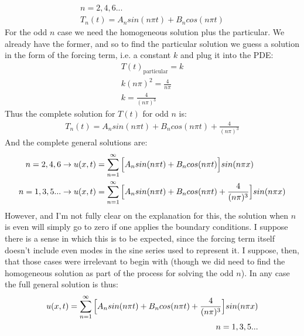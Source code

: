 \documentclass{article}
\begin{document}
\begin{equation}
\begin{aligned}
n = 2,4,6...\\
T_n(t) = A_n sin(n\pi t) + B_n cos(n\pi t)
\end{aligned}
\end{equation}
For the odd $n$ case we need the homogeneous solution plus the particular. We already have the former, and so to find the particular solution we guess a solution in the form of the forcing term, i.e. a constant $k$ and plug it into the PDE:
\begin{equation}
\begin{aligned}
T(t)_{\text{particular}} = k\\
k(n\pi)^2= \frac{4}{n\pi}\\
k = \frac{4}{(n\pi)^3}
\end{aligned}
\end{equation}
Thus the complete solution for $T(t)$ for odd $n$ is:
\begin{equation}
\begin{aligned}
T_n(t) = A_n sin(n\pi t) + B_n cos(n\pi t) + \frac{4}{(n\pi)^3}
\end{aligned}
\end{equation}
And the complete general solutions are:
\begin{equation}
\begin{aligned}
n = 2,4,6 &\to u(x,t) = \sum_{n=1}^{\infty} \Big{[} A_n sin(n\pi t) + B_n cos(n\pi t)\Big{]}sin(n\pi x)\\
n = 1,3,5... &\to u(x,t) = \sum_{n=1}^{\infty} \Big{[} A_n sin(n\pi t) + B_n cos(n\pi t) +\frac{4}{(n\pi)^3} \Big{]}sin(n\pi x)\\
\end{aligned}
\end{equation}
However, and I'm not fully clear on the explanation for this, the solution when $n$ is even will simply go to zero if one applies the boundary conditions. I suppose there is a sense in which this is to be expected, since the forcing term itself doesn't include even modes in the sine series used to represent it. I suppose, then, that those cases were irrelevant to begin with (though we did need to find the homogeneous solution as part of the process for solving the odd $n$). In any case the full general solution is thus:
\begin{equation}
\begin{aligned}
u(x,t) = \sum_{n=1}^{\infty} \Big{[} A_n sin(n\pi t) + B_n cos(n\pi t) +\frac{4}{(n\pi)^3} \Big{]}sin(n\pi x)\\
n = 1,3,5...
\end{aligned}
\end{equation}
\end{document}

